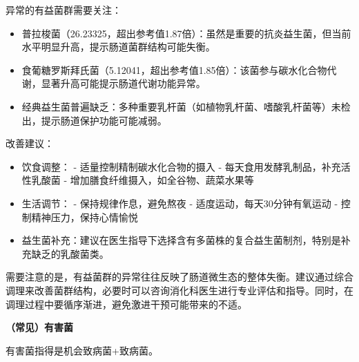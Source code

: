 \documentclass[UTF8]{ctexart}
\begin{document}
\begin{tcolorbox}[
    enhanced,
    colback=gray!3,
    colframe=gray!3,
    arc=3mm,
    boxrule=0pt,
    width=\textwidth,
    top=8pt,
    bottom=8pt
    ]
{\small{\textcolor{yellow!85!orange}{\faLightbulb}}\quad 异常的有益菌群需要关注：
\begin{itemize}
\item 普拉梭菌（26.23325，超出参考值1.87倍）：虽然是重要的抗炎益生菌，但当前水平明显升高，提示肠道菌群结构可能失衡。
\item 食葡糖罗斯拜氏菌（5.12041，超出参考值1.85倍）：该菌参与碳水化合物代谢，显著升高可能提示肠道代谢功能异常。
\item 经典益生菌普遍缺乏：多种重要乳杆菌（如植物乳杆菌、嗜酸乳杆菌等）未检出，提示肠道保护功能可能减弱。
\end{itemize}

{\textcolor{green!85!black}{\faLightbulb}}\quad 改善建议：
\begin{itemize}
\item 饮食调整：
    - 适量控制精制碳水化合物的摄入
    - 每天食用发酵乳制品，补充活性乳酸菌
    - 增加膳食纤维摄入，如全谷物、蔬菜水果等
\item 生活调节：
    - 保持规律作息，避免熬夜
    - 适度运动，每天30分钟有氧运动
    - 控制精神压力，保持心情愉悦
\item 益生菌补充：建议在医生指导下选择含有多菌株的复合益生菌制剂，特别是补充缺乏的乳酸菌类。
\end{itemize}

需要注意的是，有益菌群的异常往往反映了肠道微生态的整体失衡。建议通过综合调理来改善菌群结构，必要时可以咨询消化科医生进行专业评估和指导。同时，在调理过程中要循序渐进，避免激进干预可能带来的不适。
}
\end{tcolorbox}

\newpage

\begin{tcolorbox}[
    enhanced,
    colback=white,
    colframe=white,
    arc=2mm,
    boxrule=0pt,
    width=\textwidth,
    left=15pt,
    right=15pt,
    top=10pt,
    bottom=10pt,
    drop shadow={
        opacity=0.2,
        color=customTeal
    },
    borderline west={5pt}{0pt}{customTeal}
]
\textcolor{customTeal}{\large\textbf{（常见）有害菌}}
\end{tcolorbox}

\begin{tcolorbox}[
    enhanced,
    colback=customTealBg,
    colframe=customTealBg,
    arc=3mm,
    boxrule=0pt,
    width=\textwidth,
    top=8pt,
    bottom=8pt
]
{\small{\color{customTeal}\faInfoCircle} 有害菌指得是机会致病菌+致病菌。
}
\end{tcolorbox}
\end{document}
